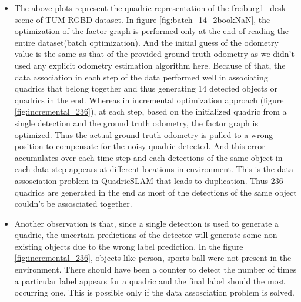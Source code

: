 \documentclass[report.tex]{subfiles}
\begin{document}
\begin{itemize}
\item The above plots represent the quadric representation of the freiburg1\_desk scene of TUM RGBD dataset. In figure \ref{fig:batch_14_2bookNaN}, the optimization of the factor graph is performed only at the end of reading the entire dataset(batch optimization). And the initial guess of the odometry value is the same as that of the provided ground truth odometry as we didn't used any explicit odometry estimation algorithm here. Because of that, the data association in each step of the data performed well in associating quadrics that belong together and thus generating 14 detected objects or quadrics in the end. Whereas in incremental optimization approach (figure \ref{fig:incremental_236}), at each step, based on the initialized quadric from a single detection and the ground truth odometry, the factor graph is optimized. Thus the actual ground truth odometry is pulled to a wrong position to compensate for the noisy quadric detected. And this error accumulates over each time step and each detections of the same object in each data step appears at different locations in environment. This is the data assosciation problem in QuadricSLAM that leads to duplication. Thus 236 quadrics are generated in the end as most of the detections of the same object couldn't be assosciated together.
\item Another observation is that, since a single detection is used to generate a quadric, the uncertain predictions of the detector will generate some non existing objects due to the wrong label prediction. In the figure \ref{fig:incremental_236}, objects like person, sports ball were not present in the environment. There should have been a counter to detect the number of times a particular label appears for a quadric and the final label should the most occurring one. This is possible only if the data assosciation problem is solved.


\end{itemize}
\end{document}
